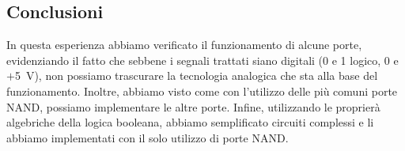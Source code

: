 \subsection*{Conclusioni}
In questa esperienza abbiamo verificato il funzionamento di alcune porte, evidenziando il fatto che sebbene i segnali trattati siano digitali (0 e 1 logico, 0 e $+$\SI{5}{\V}), non possiamo trascurare la tecnologia analogica che sta alla base del funzionamento.
Inoltre, abbiamo visto come con l'utilizzo delle più comuni porte NAND, possiamo implementare le altre porte.
Infine, utilizzando le proprierà algebriche della logica booleana, abbiamo semplificato circuiti complessi e li abbiamo implementati con il solo utilizzo di porte NAND.
